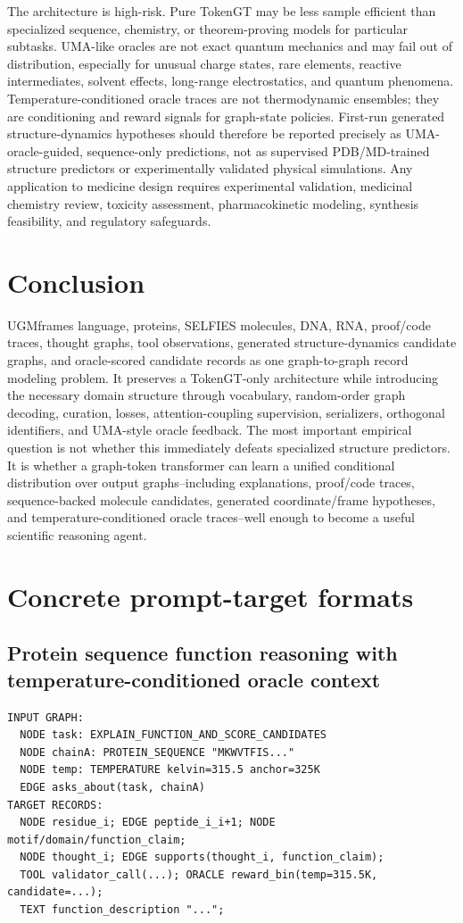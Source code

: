 \documentclass[11pt]{article}
\newcommand{\1}{\mathbf{1}}
\newcommand{\UGM}{\textsc{UGM}}
\begin{document}
The architecture is high-risk. Pure TokenGT may be less sample efficient than specialized sequence, chemistry, or theorem-proving models for particular subtasks. UMA-like oracles are not exact quantum mechanics and may fail out of distribution, especially for unusual charge states, rare elements, reactive intermediates, solvent effects, long-range electrostatics, and quantum phenomena. Temperature-conditioned oracle traces are not thermodynamic ensembles; they are conditioning and reward signals for graph-state policies. First-run generated structure-dynamics hypotheses should therefore be reported precisely as UMA-oracle-guided, sequence-only predictions, not as supervised PDB/MD-trained structure predictors or experimentally validated physical simulations. Any application to medicine design requires experimental validation, medicinal chemistry review, toxicity assessment, pharmacokinetic modeling, synthesis feasibility, and regulatory safeguards.

\section{Conclusion}

\UGM frames language, proteins, SELFIES molecules, DNA, RNA, proof/code traces, thought graphs, tool observations, generated structure-dynamics candidate graphs, and oracle-scored candidate records as one graph-to-graph record modeling problem. It preserves a TokenGT-only architecture while introducing the necessary domain structure through vocabulary, random-order graph decoding, curation, losses, attention-coupling supervision, serializers, orthogonal identifiers, and UMA-style oracle feedback. The most important empirical question is not whether this immediately defeats specialized structure predictors. It is whether a graph-token transformer can learn a unified conditional distribution over output graphs--including explanations, proof/code traces, sequence-backed molecule candidates, generated coordinate/frame hypotheses, and temperature-conditioned oracle traces--well enough to become a useful scientific reasoning agent.

\appendix
\section{Concrete prompt-target formats}

\subsection{Protein sequence function reasoning with temperature-conditioned oracle context}
\begin{lstlisting}
INPUT GRAPH:
  NODE task: EXPLAIN_FUNCTION_AND_SCORE_CANDIDATES
  NODE chainA: PROTEIN_SEQUENCE "MKWVTFIS..."
  NODE temp: TEMPERATURE kelvin=315.5 anchor=325K
  EDGE asks_about(task, chainA)
TARGET RECORDS:
  NODE residue_i; EDGE peptide_i_i+1; NODE motif/domain/function_claim;
  NODE thought_i; EDGE supports(thought_i, function_claim);
  TOOL validator_call(...); ORACLE reward_bin(temp=315.5K, candidate=...);
  TEXT function_description "...";
\end{lstlisting}
\end{document}
